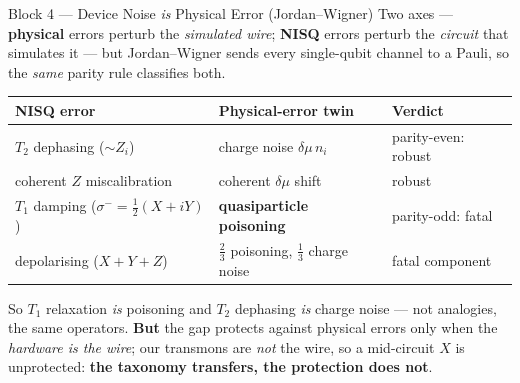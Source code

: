 \documentclass[aspectratio=169,12pt]{beamer}
\begin{document}
\begin{frame}{Block 4 --- Device Noise \emph{is} Physical Error (Jordan--Wigner)}
  \small
  Two axes --- \textbf{physical} errors perturb the \emph{simulated wire}; \textbf{NISQ} errors perturb the \emph{circuit} that simulates it --- but Jordan--Wigner sends every single-qubit channel to a Pauli, so the \emph{same} parity rule classifies both.
  \smallskip
  \begin{center}
  \renewcommand{\arraystretch}{1.25}
  \footnotesize
  \begin{tabular}{@{}lll@{}}
    \toprule
    \textbf{NISQ error} & \textbf{Physical-error twin} & \textbf{Verdict} \\
    \midrule
    $T_2$ dephasing ($\sim Z_i$) & charge noise $\delta\mu\,n_i$ & \textcolor{topological}{parity-even: robust} \\
    coherent $Z$ miscalibration & coherent $\delta\mu$ shift & \textcolor{topological}{robust} \\
    $T_1$ damping ($\sigma^-{=}\tfrac12(X{+}iY)$) & \textbf{quasiparticle poisoning} & \textcolor{trivial}{parity-odd: fatal} \\
    depolarising ($X{+}Y{+}Z$) & $\tfrac23$ poisoning, $\tfrac13$ charge noise & \textcolor{trivial}{fatal component} \\
    \bottomrule
  \end{tabular}
  \end{center}
  \smallskip
  {\footnotesize\raggedright
  So $T_1$ relaxation \emph{is} poisoning and $T_2$ dephasing \emph{is} charge noise --- not analogies, the same operators. \textbf{But} the gap protects against physical errors only when the \emph{hardware is the wire}; our transmons are \emph{not} the wire, so a mid-circuit $X$ is unprotected: \textbf{the taxonomy transfers, the protection does not}.\par}
\end{frame}
\end{document}
